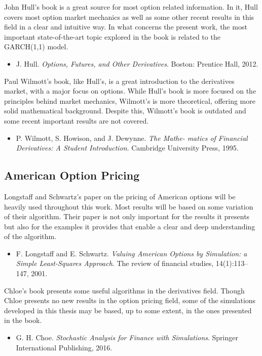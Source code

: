 \documentclass[a4paper,twocolumn,aps,prd,longbibliography,superscriptaddress]{revtex4-1}
\begin{document}
John Hull's book is a great source for most option related information. In it, Hull covers most option market mechanics as well as some other recent results in this field in a clear and intuitive way.
In what concerns the present work, the most important state-of-the-art topic explored in the book is related to the GARCH(1,1) model.
\begin{itemize}
\item J. Hull. \textit{Options, Futures, and Other Derivatives}. Boston: Prentice Hall, 2012.
\end{itemize}

Paul Wilmott's book, like Hull's, is a great introduction to the derivatives market, with a major focus on options. While Hull's book is more focused on the principles behind market mechanics, Wilmott's is more theoretical, offering more solid mathematical background.
Despite this, Wilmott's book is outdated and some recent important results are not covered.
\begin{itemize}
\item P. Wilmott, S. Howison, and J. Dewynne. \textit{The Mathe-
matics of Financial Derivatives: A Student Introduction}.
Cambridge University Press, 1995.
\end{itemize}

\subsection{American Option Pricing}
Longstaff and Schwartz's paper on the pricing of American options will be heavily used throughout this work. Most results will be based on some variation of their algorithm. Their paper is not only important for the results it presents but also for the examples it provides that enable a clear and deep understanding of the algorithm.
\begin{itemize}
\item  F. Longstaff and E. Schwartz. \textit{Valuing American Options by Simulation: a Simple Least-Squares Approach}. The review of financial studies, 14(1):113–147, 2001.
\end{itemize}

Chloe's book presents some useful algorithms in the derivatives field. Though Chloe presents no new results in the option pricing field, some of the simulations developed in this thesis may be based, up to some extent, in the ones presented in the book.
\begin{itemize}
\item G. H. Choe. \textit{Stochastic Analysis for Finance with Simulations}. Springer International Publishing, 2016.
\end{itemize}
\end{document}
